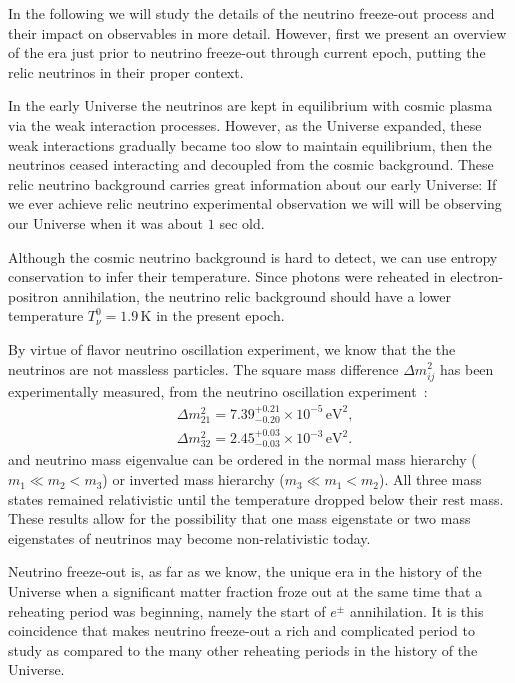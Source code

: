 In the following we will study the details of the neutrino freeze-out process and their impact on observables in more detail. However, first we present an overview of the era just prior to neutrino freeze-out through current epoch, putting the relic neutrinos in their proper context.

In the early Universe the neutrinos are kept in equilibrium with cosmic plasma via the weak interaction processes. However, as the Universe expanded, these weak interactions gradually became too slow to maintain equilibrium, then the neutrinos ceased interacting and decoupled from the cosmic background. These relic neutrino background carries great information about our early Universe: If we ever achieve relic neutrino experimental observation we will will be observing our Universe when it was about $1$ sec old. 

Although the cosmic neutrino background is hard to detect, we can use entropy conservation to infer their temperature. Since photons were reheated in electron-positron annihilation, the neutrino relic background  should have a lower  temperature $T_\nu^0=1.9\,\mathrm{K}$ in the present epoch.

By virtue of flavor  neutrino oscillation experiment, we know that the the neutrinos are not massless particles.  The square mass difference $\Delta m^2_{ij}$ has been experimentally measured, from the neutrino oscillation experiment~\cite{ParticleDataGroup:2022pth}:
\begin{align}
&\Delta{m}_{21}^2=7.39^{+0.21}_{-0.20}\times10^{-5}\,\mathrm{eV}^2,\\
&\Delta{m}_{32}^2=2.45^{+0.03}_{-0.03}\times10^{-3}\,\mathrm{eV}^2.
\end{align}
and neutrino mass eigenvalue can be ordered in the normal mass hierarchy ($m_1\ll m_2<m_3$) or inverted mass hierarchy ($m_3\ll m_1<m_2$). All three mass states remained relativistic until the temperature dropped below their rest mass. These results allow for the possibility that one mass eigenstate or two mass eigenstates of neutrinos may become non-relativistic today. 


Neutrino freeze-out is, as far as we know, the unique era in the history of the Universe when a significant matter fraction froze out at the same time that a reheating period was beginning, namely the start of $e^\pm$ annihilation. It is this coincidence that makes neutrino freeze-out a rich and complicated period to study as compared to the many other reheating periods in the history of the Universe. 

